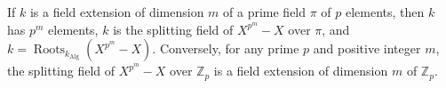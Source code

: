 If $k$ is a field extension of dimension $m$ of a prime field $\pi$ of $p$ elements, then $k$ has $p^m$ elements, $k$ is the splitting field of $X^{p^m} - X$ over $\pi$, and $k = \operatorname{Roots}_{k_{\text{Alg}}}(X^{p^m} - X)$. Conversely, for any prime $p$ and positive integer $m$, the splitting field of $X^{p^m} - X$ over $\mathbb{Z}_p$ is a field extension of dimension $m$ of $\mathbb{Z}_p$.
